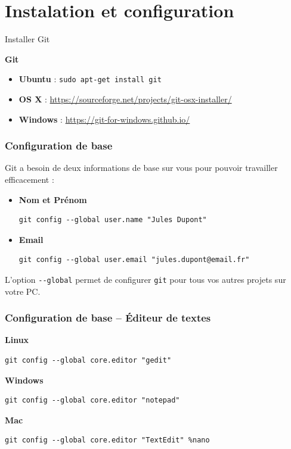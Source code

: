 \documentclass{beamer}
\begin{document}
\section{Instalation et configuration}
\begin{frame}{Installer Git}

\textbf{Git}
\begin{itemize}
    \item[] \textbf{Ubuntu} : \lstinline{sudo apt-get install git}
    \item[] \textbf{OS X} : \url{https://sourceforge.net/projects/git-osx-installer/}
    \item[] \textbf{Windows} : \url{https://git-for-windows.github.io/}
\end{itemize}
\end{frame}

\begin{frame}[fragile]
\frametitle{Configuration de base}

Git a besoin de deux informations de base sur vous pour pouvoir travailler efficacement :

\begin{itemize}
\item \textbf{Nom et Prénom}
\begin{lstlisting}
git config --global user.name "Jules Dupont"
\end{lstlisting}

\item \textbf{Email}
\begin{lstlisting}
git config --global user.email "jules.dupont@email.fr"
\end{lstlisting}
\end{itemize}

L'option \lstinline{--global} permet de configurer \texttt{git} pour tous vos autres projets sur votre PC.
\end{frame}

\begin{frame}
\frametitle{Configuration de base -- Éditeur de textes}
\item \textbf{Linux}
\begin{lstlisting}
git config --global core.editor "gedit"
\end{lstlisting}
\item \textbf{Windows}
\begin{lstlisting}
git config --global core.editor "notepad"
\end{lstlisting}
\item \textbf{Mac}
\begin{lstlisting}
git config --global core.editor "TextEdit" %nano
\end{lstlisting}
\end{frame}
\end{document}
